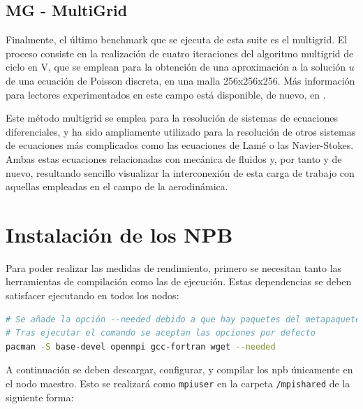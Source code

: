 \subsection{MG - MultiGrid}
Finalmente, el último benchmark que se ejecuta de esta suite es el multigrid. El proceso consiste en la realización de cuatro iteraciones del algoritmo multigrid de ciclo en V, que se emplean para la obtención de una aproximación a la solución $u$ de una ecuación de Poisson discreta, en una malla 256x256x256. Más información para lectores experimentados en este campo está disponible, de nuevo, en \cite[2.2.2]{benchmarks1994technical}.

Este método multigrid se emplea para la resolución de sistemas de ecuaciones diferenciales, y ha sido ampliamente utilizado para la resolución de otros sistemas de ecuaciones más complicados como las ecuaciones de Lamé o las Navier-Stokes. Ambas estas ecuaciones relacionadas con mecánica de fluidos y, por tanto y de nuevo, resultando sencillo visualizar la interconexión de esta carga de trabajo con aquellas empleadas en el campo de la aerodinámica.  

\section{Instalación de los NPB}
Para poder realizar las medidas de rendimiento, primero se necesitan tanto las herramientas de compilación como las de ejecución. Estas dependencias se deben satisfacer ejecutando en todos los nodos:

\begin{lstlisting}[language=bash]
# Se añade la opción --needed debido a que hay paquetes del metapaquete base-devel que ya están instalados, y no es necesario reinstalar.
# Tras ejecutar el comando se aceptan las opciones por defecto
pacman -S base-devel openmpi gcc-fortran wget --needed
\end{lstlisting}

A continuación se deben descargar, configurar, y compilar los \acrlong{npb} únicamente en el nodo maestro. Esto se realizará como \texttt{mpiuser} en la carpeta \texttt{/mpishared} de la siguiente forma:

